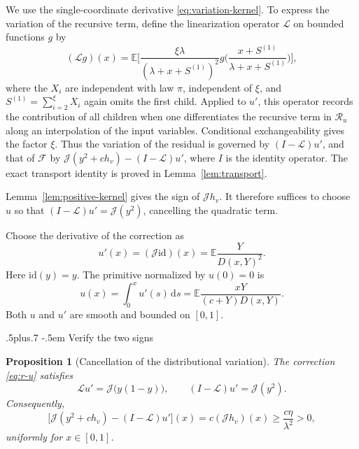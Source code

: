 \documentclass[11pt,reqno]{amsart}
\makeatletter
\def\subsection{\@startsection{subsection}{2}{0pt}%
  {.5\linespacing plus.7\linespacing}
  {-.5em}
  {\normalfont\scshape}}
\theoremstyle{plain}
\newtheorem{proposition}[theorem]{Proposition}
\theoremstyle{definition}
\theoremstyle{remark}
\numberwithin{equation}{section}
\newcommand{\E}{\mathbb E}
\newcommand{\dd}{\,\mathrm d}
\newcommand{\cJ}{\mathcal J}
\newcommand{\cL}{\mathcal L}
\newcommand{\cF}{\mathcal F}
\newcommand{\res}{\mathcal R}
\makeatother
\begin{document}
We use the single-coordinate derivative \eqref{eq:variation-kernel}.
To express the variation of the recursive term, define the linearization
operator $\cL$ on bounded functions $g$ by
\begin{equation}\label{eq:L}
 (\cL g)(x)=\E\biggl[
 \frac{\xi\lambda}{(\lambda+x+S^{(1)})^2}
 g\biggl(\frac{x+S^{(1)}}{\lambda+x+S^{(1)}}\biggr)
 \biggr],
\end{equation}
where the $X_i$ are independent with law $\pi$, independent of $\xi$,
and $S^{(1)}=\sum_{i=2}^{\xi}X_i$ again omits the first child.
Applied to $u'$, this operator records the contribution of all children when
one differentiates the recursive term in $\res_u$ along an interpolation
of the input variables. Conditional exchangeability gives the factor
$\xi$. Thus the variation of the residual is governed by $(I-\cL)u'$,
and that of $\cF$ by $\cJ(y^2+c h_v)-(I-\cL)u'$, where $I$ is the
identity operator. The exact transport identity is
proved in Lemma~\ref{lem:transport}.

Lemma~\ref{lem:positive-kernel} gives the sign of $\cJ h_v$. It therefore suffices
to choose $u$ so that $(I-\cL)u'=\cJ(y^2)$, cancelling the quadratic term.

Choose the derivative of the correction as
\begin{equation}\label{eq:r-u}
 \boxed{\quad u'(x)=(\cJ\mathrm{id})(x)=\E\frac{Y}{D(x,Y)^2}.\quad}
\end{equation}
Here $\mathrm{id}(y)=y$. The primitive normalized by $u(0)=0$ is
\begin{equation}\label{eq:u-explicit}
 u(x)=\int_0^x u'(s)\dd s
     =\E\frac{xY}{(c+Y)D(x,Y)}.
\end{equation}
Both $u$ and $u'$ are smooth and bounded on $[0,1]$.

\subsection{Verify the two signs}

\begin{proposition}[Cancellation of the distributional variation]\label{prop:cancel-law}
The correction \eqref{eq:r-u} satisfies
\begin{equation}\label{eq:Lr}
 \cL u'=\cJ\bigl(y(1-y)\bigr),\qquad
 (I-\cL)u'=\cJ(y^2).
\end{equation}
Consequently,
\begin{equation}\label{eq:law-margin}
 \boxed{\quad
 \bigl[\cJ(y^2+c h_v)-(I-\cL)u'\bigr](x)
 =c(\cJ h_v)(x)\ge\frac{c\eta}{\lambda^2}>0,
 \quad}
\end{equation}
uniformly for $x\in[0,1]$.
\end{proposition}
\end{document}
